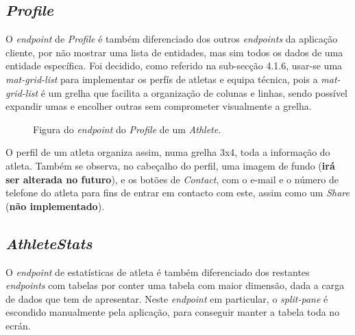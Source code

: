 \subsection{\textit{Profile}}\label{subsec424}
O \textit{endpoint} de \textit{Profile} é também diferenciado dos outros \textit{endpoints} da aplicação cliente, por não mostrar uma lista de entidades, mas sim todos os dados de uma entidade específica. 
Foi decidido, como referido na sub-secção 4.1.6, usar-se uma \textit{mat-grid-list} para implementar os perfís de atletas e equipa técnica, pois a \textit{mat-grid-list} é um grelha que facilita a organização de colunas e linhas, sendo possível expandir umas e encolher outras sem comprometer visualmente a grelha. 
\newpage
\begin{figure}[h]
	\begin{center}
	\end{center}
	\caption{Figura do \textit{endpoint} do \textit{Profile} de um \textit{Athlete}.}\label{fig:athleteprofile}
\end{figure}

O perfil de um atleta organiza assim, numa grelha 3x4, toda a informação do atleta. Também se observa, no cabeçalho do perfil, uma imagem de fundo (\textbf{irá ser alterada no futuro}), e os botões de \textit{Contact}, com o e-mail e o número de telefone do atleta para fins de entrar em contacto com este, assim como um \textit{Share} (\textbf{não implementado}).



\subsection{\textit{AthleteStats}}\label{subsec425}
O \textit{endpoint} de estatísticas de atleta é também diferenciado dos restantes \textit{endpoints} com tabelas por conter uma tabela com maior dimensão, dada a carga de dados que tem de apresentar. Neste \textit{endpoint} em particular, o \textit{split-pane} é escondido manualmente pela aplicação, para conseguir manter a tabela toda no ecrán. 

